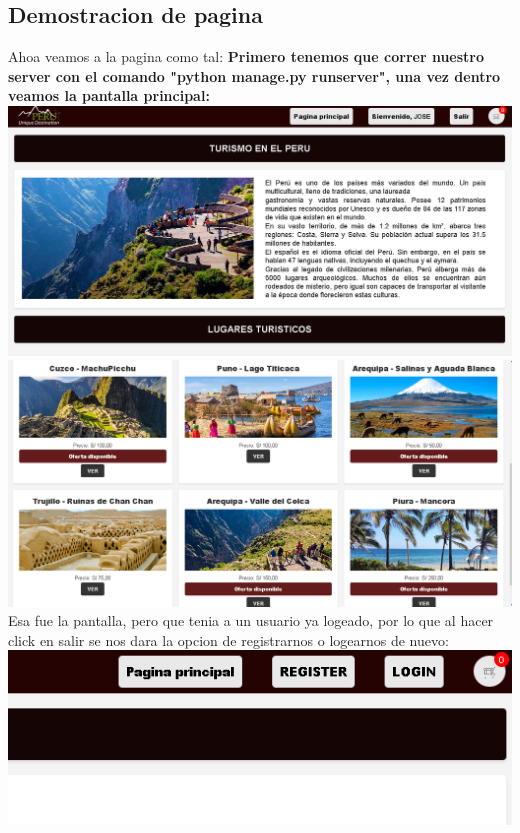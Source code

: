 \documentclass{article}
\begin{document}
        \subsection{Demostracion de pagina}
        Ahoa veamos a la pagina como tal:\newline\newline
        \textbf{Primero tenemos que correr nuestro server con el comando "python manage.py runserver", una vez dentro veamos la pantalla principal:} \newline \newline \newline \newline 
        \includegraphics[width=16cm]{img/PAGINA INICIAL 1.png}
        \newline\newline
        \includegraphics[width=16cm]{img/imagen_2023-06-29_011451598.png}
        Esa fue la pantalla, pero que tenia a un usuario ya logeado, por lo que al hacer click en salir se nos dara la opcion de registrarnos o logearnos de nuevo:
        \newline\newline
        \includegraphics[width=16cm]{img/deslog.png}
\end{document}
